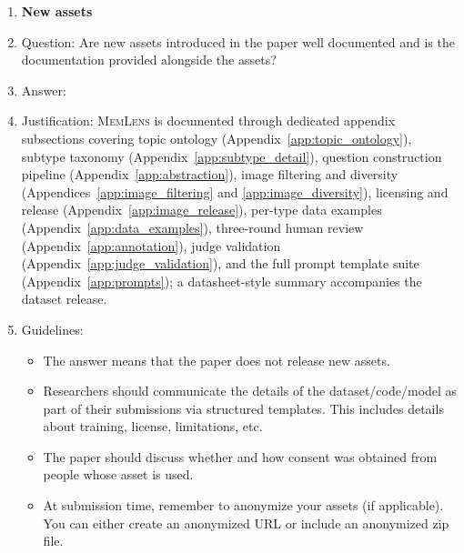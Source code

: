 \documentclass{article}
\newcommand{\bench}{\textsc{MemLens}}
\begin{document}
\begin{enumerate}
\item {\bf New assets}
    \item[] Question: Are new assets introduced in the paper well documented and is the documentation provided alongside the assets?
    \item[] Answer: \answerYes{}
    \item[] Justification: \bench{} is documented through dedicated appendix subsections covering topic ontology (Appendix~\ref{app:topic_ontology}), subtype taxonomy (Appendix~\ref{app:subtype_detail}), question construction pipeline (Appendix~\ref{app:abstraction}), image filtering and diversity (Appendices~\ref{app:image_filtering} and \ref{app:image_diversity}), licensing and release (Appendix~\ref{app:image_release}), per-type data examples (Appendix~\ref{app:data_examples}), three-round human review (Appendix~\ref{app:annotation}), judge validation (Appendix~\ref{app:judge_validation}), and the full prompt template suite (Appendix~\ref{app:prompts}); a datasheet-style summary accompanies the dataset release.
    \item[] Guidelines:
    \begin{itemize}
        \item The answer \answerNA{} means that the paper does not release new assets.
        \item Researchers should communicate the details of the dataset\slash code\slash model as part of their submissions via structured templates. This includes details about training, license, limitations, etc.
        \item The paper should discuss whether and how consent was obtained from people whose asset is used.
        \item At submission time, remember to anonymize your assets (if applicable). You can either create an anonymized URL or include an anonymized zip file.
    \end{itemize}


\end{enumerate}
\end{document}
